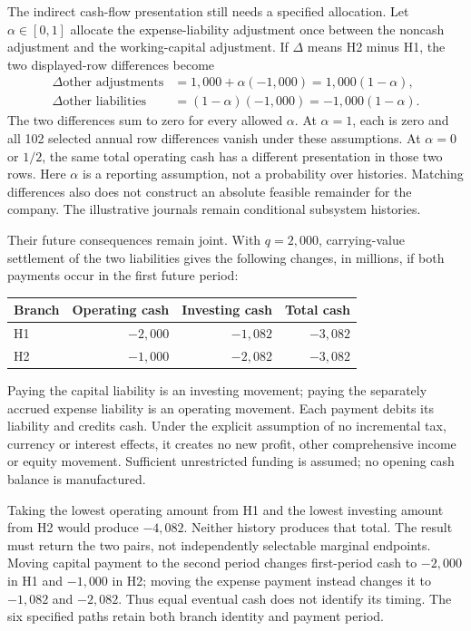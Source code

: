 The indirect cash-flow presentation still needs a specified allocation. Let
$\alpha\in[0,1]$ allocate the expense-liability adjustment once between the
noncash adjustment and the working-capital adjustment. If $\Delta$ means
H2 minus H1, the two displayed-row differences become
\begin{align}
\Delta\text{other adjustments}
 &=1{,}000+\alpha(-1{,}000)=1{,}000(1-\alpha),\\
\Delta\text{other liabilities}
 &=(1-\alpha)(-1{,}000)=-1{,}000(1-\alpha).
\label{eq:real-package-cash-presentation}
\end{align}
The two differences sum to zero for every allowed $\alpha$. At $\alpha=1$,
each is zero and all 102 selected annual row differences vanish under these
assumptions. At $\alpha=0$ or $1/2$, the same total operating cash has a
different presentation in those two rows. Here $\alpha$ is a reporting
assumption, not a probability over histories. Matching differences also does
not construct an absolute feasible remainder for the company. The illustrative
journals remain conditional subsystem histories.

Their future consequences remain joint. With $q=2{,}000$, carrying-value
settlement of the two liabilities gives the following changes, in millions,
if both payments occur in the first future period:
\begin{center}
\begin{tabular}{lrrr}
\toprule Branch & Operating cash & Investing cash & Total cash\\\midrule
H1 & $-2{,}000$ & $-1{,}082$ & $-3{,}082$\\
H2 & $-1{,}000$ & $-2{,}082$ & $-3{,}082$\\\bottomrule
\end{tabular}
\end{center}
Paying the capital liability is an investing movement; paying the separately
accrued expense liability is an operating movement. Each payment debits its
liability and credits cash. Under the explicit assumption of no incremental
tax, currency or interest effects, it creates no new profit, other
comprehensive income or equity movement. Sufficient unrestricted funding is
assumed; no opening cash balance is manufactured.

Taking the lowest operating amount from H1 and the lowest investing amount
from H2 would produce $-4{,}082$. Neither history produces that total. The
result must return the two pairs, not independently selectable marginal
endpoints. Moving capital payment to the second period changes first-period
cash to $-2{,}000$ in H1 and $-1{,}000$ in H2; moving the expense payment
instead changes it to $-1{,}082$ and $-2{,}082$. Thus equal eventual cash does
not identify its timing. The six specified paths retain both branch identity
and payment period.

